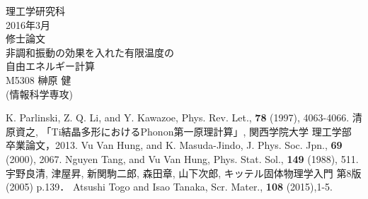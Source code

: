 \documentclass[12pt,a4]{jreport}%
\begin{document}
\begin{titlepage}
    \begin{center}
    \null
    \LARGE 理工学研究科\\
            \vspace{1.5cm}
    \LARGE 2016年3月\\
            \vspace{1.5cm}
    \LARGE 修士論文\\
            \vspace{2cm}
    \huge 非調和振動の効果を入れた有限温度の\\自由エネルギー計算\\
            \vspace{6cm}%
    \LARGE M5308   榊原 健\\(情報科学専攻)
    \end{center}
\end{titlepage}



\tableofcontents


\begin{thebibliography}{9}
K. Parlinski, Z. Q. Li, and Y. Kawazoe, Phys. Rev. Let., {\bf 78} (1997), 4063-4066.
清原資之, 「Ti結晶多形におけるPhonon第一原理計算」, 関西学院大学 理工学部 卒業論文，2013. 
Vu Van Hung, and K. Masuda-Jindo, J. Phys. Soc. Jpn., {\bf 69} (2000), 2067.
Nguyen Tang, and Vu Van Hung, Phys. Stat. Sol., {\bf 149} (1988), 511.
宇野良清, 津屋昇, 新関駒二郎, 森田章, 山下次郎, キッテル固体物理学入門 第8版(2005) p.139．
Atsushi Togo and Isao Tanaka, Scr. Mater., {\bf108} (2015),1-5.
\end{thebibliography}
\end{document}
